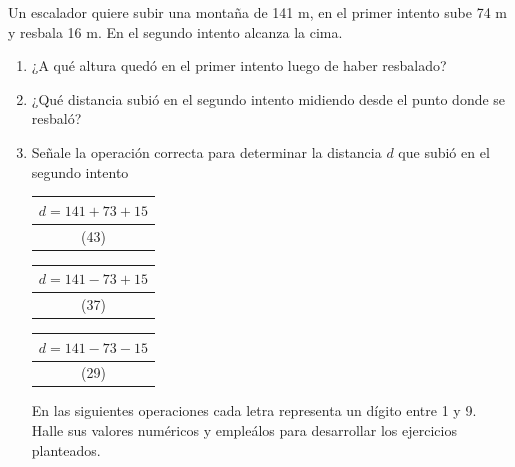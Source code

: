 \documentclass[10pt,twoside]{article}
\begin{document}
 Un escalador quiere subir una montaña de 141 m, en el primer intento sube 74 m y resbala 16 m. En el segundo intento alcanza la cima.
 \begin{enumerate}
 \item ¿A qué altura quedó en el primer intento luego de haber resbalado?
 \item ¿Qué distancia subió en el segundo intento midiendo desde el punto donde se resbaló?
 \item Señale la operación correcta para determinar la distancia $d$ que subió en el segundo intento
 \begin{center}
\begin{tabular}{|c|}
\hline 
$d=141+73+15$ \\ 
\hline 
(43) \\ 
\hline 
\end{tabular} 
\begin{tabular}{|c|}
\hline 
$d=141-73+15$ \\ 
\hline 
(37) \\ 
\hline 
\end{tabular} 
\begin{tabular}{|c|}
\hline 
$d=141-73-15$ \\ 
\hline 
(29) \\ 
\hline 
\end{tabular} 
 \end{center}
 En las siguientes operaciones cada letra representa un dígito entre 1 y 9. Halle sus valores numéricos y empleálos para desarrollar los ejercicios planteados.


\end{enumerate}
\end{document}
